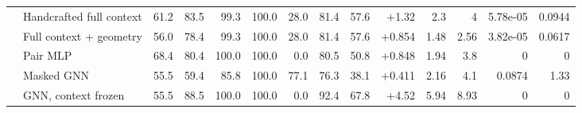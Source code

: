 \begin{tabular}{@{}llrrrrrrrrrrrr@{}}
 & Handcrafted full context & 61.2 & 83.5 & 99.3 & 100.0 & 28.0 & 81.4 & 57.6 & +1.32 & 2.3 & 4 & 5.78e-05 & 0.0944 \\
 & Full context + geometry & 56.0 & 78.4 & 99.3 & 100.0 & 28.0 & 81.4 & 57.6 & +0.854 & 1.48 & 2.56 & 3.82e-05 & 0.0617 \\
 & Pair MLP & 68.4 & 80.4 & 100.0 & 100.0 & 0.0 & 80.5 & 50.8 & +0.848 & 1.94 & 3.8 & 0 & 0 \\
 & Masked GNN & 55.5 & 59.4 & 85.8 & 100.0 & 77.1 & 76.3 & 38.1 & +0.411 & 2.16 & 4.1 & 0.0874 & 1.33 \\
 & GNN, context frozen & 55.5 & 88.5 & 100.0 & 100.0 & 0.0 & 92.4 & 67.8 & +4.52 & 5.94 & 8.93 & 0 & 0 \\
\bottomrule
\end{tabular}

